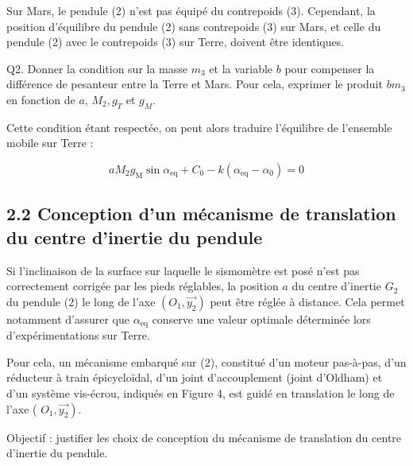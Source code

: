 \documentclass[10pt]{article}
\begin{document}
Sur Mars, le pendule (2) n'est pas équipé du contrepoids (3). Cependant, la position d'équilibre du pendule (2) sans contrepoids (3) sur Mars, et celle du pendule (2) avec le contrepoids (3) sur Terre, doivent être identiques.

Q2. Donner la condition sur la masse $m_{3}$ et la variable $b$ pour compenser la différence de pesanteur entre la Terre et Mars. Pour cela, exprimer le produit $b m_{3}$ en fonction de $a$, $M_{2}, g_{T}$ et $g_{M}$.

Cette condition étant respectée, on peut alors traduire l'équilibre de l'ensemble mobile sur Terre :


\begin{equation*}
a M_{2} g_{\mathrm{M}} \sin \alpha_{\mathrm{eq}}+C_{0}-k\left(\alpha_{\mathrm{eq}}-\alpha_{0}\right)=0 \tag{eq.1}
\end{equation*}


\subsection*{2.2 Conception d'un mécanisme de translation du centre d'inertie du pendule}
Si l'inclinaison de la surface sur laquelle le sismomètre est posé n'est pas correctement corrigée par les pieds réglables, la position $a$ du centre d'inertie $G_{2}$ du pendule (2) le long de l'axe $\left(O_{1}, \overrightarrow{y_{2}}\right)$ peut être réglée à distance. Cela permet notamment d'assurer que $\alpha_{\mathrm{eq}}$ conserve une valeur optimale déterminée lors d'expérimentations sur Terre.

Pour cela, un mécanisme embarqué sur (2), constitué d'un moteur pas-à-pas, d'un réducteur à train épicycloïdal, d'un joint d'accouplement (joint d'Oldham) et d'un système vis-écrou, indiqués en Figure 4, est guidé en translation le long de l'axe ( $\left.O_{1}, \overrightarrow{y_{2}}\right)$.

Objectif : justifier les choix de conception du mécanisme de translation du centre d'inertie du pendule.
\end{document}
